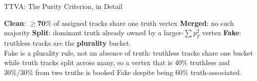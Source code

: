 \documentclass[xcolor=table,aspectratio=169]{beamer}
\begin{document}
\begin{frame}{TTVA: The Purity Criterion, in Detail}
\begin{center}
{}
    \end{center}
    \vspace{-0.3em}
    {\scriptsize \textbf{Clean}: $\mathbf{\geq70\%}$ of assigned tracks share one truth vertex \;\textbullet\;
    \textbf{Merged}: no such majority \;\textbullet\;
    \textbf{Split}: dominant truth already owned by a larger-$\sum p_T^2$ vertex \;\textbullet\;
    \textbf{Fake}: truthless tracks are the \textbf{plurality} bucket.}\\[1pt]
    {\scriptsize\textcolor{black!55}{Fake is a plurality rule, not an absence of truth:
    truthless tracks share one bucket while truth tracks split across many, so a vertex
    that is $40\%$ truthless and $30\%/30\%$ from two truths is booked Fake despite
    being $60\%$ truth-associated.}}
\end{frame}
\end{document}
